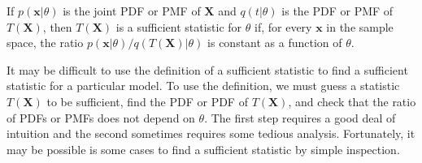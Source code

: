 \begin{theorem}
If $p(\mathbf{x}|\theta)$ is the joint PDF or PMF of $\mathbf{X}$ and $q(t|\theta)$ is the PDF or PMF of $T(\mathbf{X})$, then $T(\mathbf{X})$ is a sufficient statistic for $\theta$ if, for every $\mathbf{x}$ in the sample space, the ratio $p(\mathbf{x}|\theta)/q(T(\mathbf{X})|\theta)$ is constant as a function of $\theta$.
\end{theorem}

It may be difficult to use the definition of a sufficient statistic to find a sufficient statistic for a particular model.
To use the definition, we must guess a statistic $T(\mathbf{X})$ to be sufficient, find the PDF or PDF of $T(\mathbf{X})$, and check that the ratio of PDFs or PMFs does not depend on $\theta$.
The first step requires a good deal of intuition and the second sometimes requires some tedious analysis.
Fortunately, it may be possible is some cases to find a sufficient statistic by simple inspection.

\newpage

